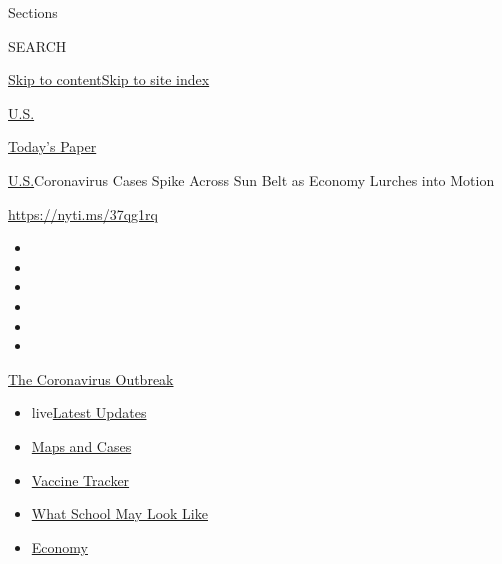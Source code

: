 Sections

SEARCH

\protect\hyperlink{site-content}{Skip to
content}\protect\hyperlink{site-index}{Skip to site index}

\href{https://www.nytimes.com/section/us}{U.S.}

\href{https://myaccount.nytimes.com/auth/login?response_type=cookie\&client_id=vi}{}

\href{https://www.nytimes.com/section/todayspaper}{Today's Paper}

\href{/section/us}{U.S.}\textbar{}Coronavirus Cases Spike Across Sun
Belt as Economy Lurches into Motion

\url{https://nyti.ms/37qg1rq}

\begin{itemize}
\item
\item
\item
\item
\item
\item
\end{itemize}

\href{https://www.nytimes.com/news-event/coronavirus?action=click\&pgtype=Article\&state=default\&region=TOP_BANNER\&context=storylines_menu}{The
Coronavirus Outbreak}

\begin{itemize}
\tightlist
\item
  live\href{https://www.nytimes.com/2020/08/01/world/coronavirus-covid-19.html?action=click\&pgtype=Article\&state=default\&region=TOP_BANNER\&context=storylines_menu}{Latest
  Updates}
\item
  \href{https://www.nytimes.com/interactive/2020/us/coronavirus-us-cases.html?action=click\&pgtype=Article\&state=default\&region=TOP_BANNER\&context=storylines_menu}{Maps
  and Cases}
\item
  \href{https://www.nytimes.com/interactive/2020/science/coronavirus-vaccine-tracker.html?action=click\&pgtype=Article\&state=default\&region=TOP_BANNER\&context=storylines_menu}{Vaccine
  Tracker}
\item
  \href{https://www.nytimes.com/interactive/2020/07/29/us/schools-reopening-coronavirus.html?action=click\&pgtype=Article\&state=default\&region=TOP_BANNER\&context=storylines_menu}{What
  School May Look Like}
\item
  \href{https://www.nytimes.com/live/2020/07/31/business/stock-market-today-coronavirus?action=click\&pgtype=Article\&state=default\&region=TOP_BANNER\&context=storylines_menu}{Economy}
\end{itemize}

